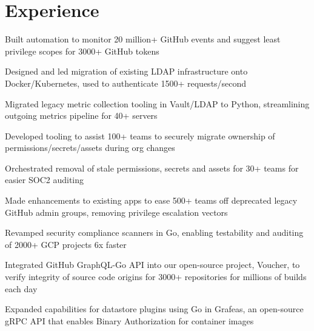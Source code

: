 \documentclass[]{deedy-resume}
\begin{document}
%
%



\section{Experience}

\begin{tightemize}
\item Built automation to monitor 20 million+ GitHub events and suggest least privilege scopes for 3000+ GitHub tokens
\item Designed and led migration of existing LDAP infrastructure onto Docker/Kubernetes, used to authenticate 1500+ requests/second
\item Migrated legacy metric collection tooling in Vault/LDAP to Python, streamlining outgoing metrics pipeline for 40+ servers
\item Developed tooling to assist 100+ teams to securely migrate ownership of permissions/secrets/assets during org changes
\item Orchestrated removal of stale permissions, secrets and assets for 30+ teams for easier SOC2 auditing
\item Made enhancements to existing apps to ease 500+ teams off deprecated legacy GitHub admin groups, removing privilege escalation vectors
\end{tightemize}
\sectionsep

\begin{tightemize}
\item Revamped security compliance scanners in Go, enabling testability and auditing of 2000+ GCP projects 6x faster
\item Integrated GitHub GraphQL-Go API into our open-source project, Voucher, to verify integrity of source code origins for 3000+ repositories for millions of builds each day
\item Expanded capabilities for datastore plugins using Go in Grafeas, an open-source gRPC API that enables Binary Authorization for container images
\end{tightemize}
\sectionsep
\end{document}
